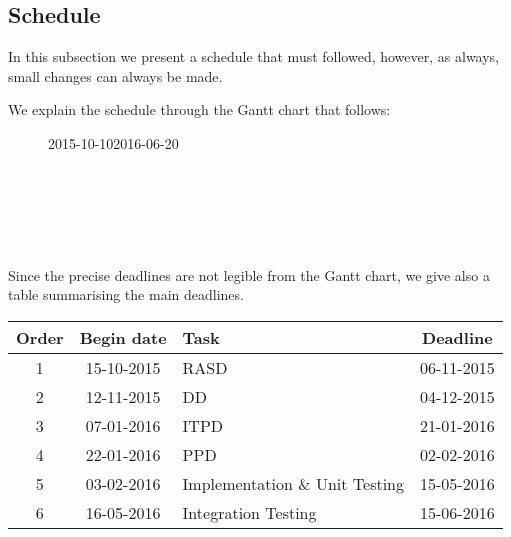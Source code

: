 \subsection{Schedule} %
\label{sub:schedule}

In this subsection we present a schedule that must followed, however, as always, small changes can always be made.

We explain the schedule through the Gantt chart that follows:

\begin{figure}[!h]
    \hspace*{-2.0cm}
    \begin{ganttchart}[
    		vgrid={*{6}{draw=none}, dotted},
    		hgrid={dotted},
    		time slot format=isodate,
			x unit=0.5mm,
			progress=today,
			progress label text={#1}\%,
	        today=2016-02-02,
	        today rule/.style= {gray!80, thick},
	        today label=Today,
	        today label/.style = {black},
	        link bulge=1, link tolerance=0,
    	]{2015-10-10}{2016-06-20}
         \\
         \\
         \\
         \\
         \\
         \\
    \end{ganttchart}
    \label{tab:gantt}
\end{figure}

Since the precise deadlines are not legible from the Gantt chart, we give also a table summarising the main deadlines.

\begin{center}
\begin{tabular}{ |c|c|l|c| } \hline
	\textbf{Order} & \textbf{Begin date} & \textbf{Task} & \textbf{Deadline} \\ \hline
	1 & 15-10-2015 & RASD & 06-11-2015 \\ \hline
	2 & 12-11-2015 & DD & 04-12-2015 \\ \hline
	3 & 07-01-2016 & ITPD & 21-01-2016 \\ \hline
	4 & 22-01-2016 & PPD & 02-02-2016 \\ \hline
	5 & 03-02-2016 & Implementation \& Unit Testing  & 15-05-2016 \\ \hline
	6 & 16-05-2016 & Integration Testing  & 15-06-2016 \\ \hline
\end{tabular}
\end{center}


